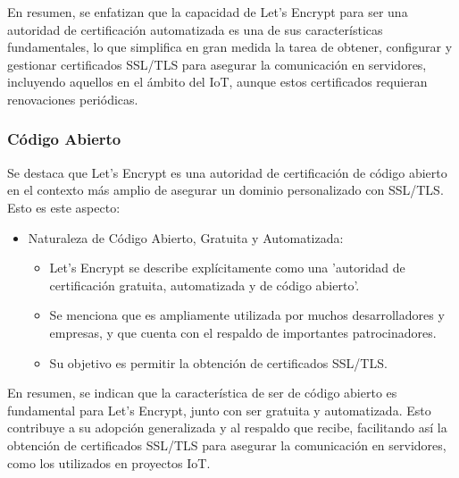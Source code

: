 \documentclass{report}
\begin{document}
En resumen, se  enfatizan que la capacidad de Let's Encrypt para ser una autoridad de certificación automatizada es una de sus 
características fundamentales, lo que simplifica en gran medida la tarea de obtener, configurar y gestionar certificados SSL/TLS para 
asegurar la comunicación en servidores, incluyendo aquellos en el ámbito del IoT, aunque estos certificados requieran renovaciones periódicas.

\subsubsection{Código Abierto}
Se destaca que Let's Encrypt es una autoridad de certificación de código abierto en el contexto más 
amplio de asegurar un dominio personalizado con SSL/TLS.
Esto es este aspecto:
\begin{itemize}
    \item Naturaleza de Código Abierto, Gratuita y Automatizada:
        \begin{itemize}
            \item Let's Encrypt se describe explícitamente como una 'autoridad de certificación gratuita, automatizada y de código abierto'.
            \item Se menciona que es ampliamente utilizada por muchos desarrolladores y empresas, y que cuenta con el respaldo de importantes patrocinadores.
            \item Su objetivo es permitir la obtención de certificados SSL/TLS.
        \end{itemize}
\end{itemize}
En resumen, se  indican que la característica de ser de código abierto es fundamental para Let's Encrypt, junto con ser 
gratuita y automatizada. Esto contribuye a su adopción generalizada y al respaldo que recibe, facilitando así la obtención de 
certificados SSL/TLS para asegurar la comunicación en servidores, como los utilizados en proyectos IoT.
\end{document}
